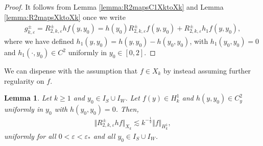 \documentclass[11pt,reqno]{amsproc}
\newtheorem{lemma}[proposition]{Lemma}
\theoremstyle{definition}
\numberwithin{equation}{section}
\newcommand{\ep}{\varepsilon}
\begin{document}
\begin{proof}
It follows from Lemma \ref{lemma:R2mapsC1XktoXk} and Lemma \ref{lemma:R2mapsXktoXk} once we write
\begin{align*}
g_{k,\ep}^\pm = R_{2,k,\ep}^\pm h f(y,y_0) = h(y_0) R_{2,k,\ep}^\pm f(y,y_0) + R_{2,k,\ep}^\pm h_1f(y,y_0),
\end{align*}
where we have defined $h_1(y,y_0) = h(y,y_0) - h(y_0,y_0)$, with $h_1(y_0,y_0)=0$ and $h_1(\cdot,y_0)\in C^2$ uniformly in $y_0\in [0,2]$.
\end{proof}

We can dispense with the assumption that $f\in X_k$ by instead assuming further regularity on $f$.

\begin{lemma}\label{lemma:R2mapsC1H1toXk}
Let $k\geq 1$ and $y_0\in I_S\cup I_W$. Let $f(y)\in H^1_k$ and $h(y,y_0)\in C^2_y$ uniformly in $y_0$ with $h(y_0,y_0) = 0$. Then,
\begin{align*}
\Vert R_{2,k,\ep}^\pm hf \Vert_{X_k}\lesssim k^{-\frac12} \Vert f \Vert_{H^1_k},
\end{align*}
uniformly for all $0<\ep<\ep_*$ and all $y_0\in I_S\cup I_W$. 
\end{lemma}
\end{document}
